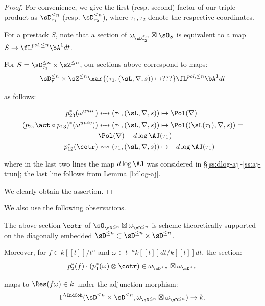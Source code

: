 \begin{proof}

For convenience, we give the first (resp. second) factor
of our triple product as
$\sD_{\tau_1}^{\leq n}$ (resp. $\sD_{\tau_2}^{\leq n}$),
where $\tau_1,\tau_2$ denote the respective coordinates.

For a prestack $S$, note that a section of
$\omega_{\sD_{\tau_2}^{\leq n}} \boxtimes \sO_S$ is equivalent to
a map $S \to \fL^{pol,\leq n} \bA^1 dt$.

For $S = \sD_{\tau_1}^{\leq n} \times \sZ^{\leq n}$,
our sections above correspond to maps:
%
\[
\sD_{\tau_1}^{\leq n} \times \sZ^{\leq n}
\xar{(\tau_1,(\sL,\nabla,s)) \mapsto ???}
\fL^{pol,\leq n} \bA^1 dt
\]

 as follows:

\begin{align*}
p_{23}^*(\omega^{univ}) & \leftrightsquigarrow
(\tau_1,(\sL,\nabla,s)) \mapsto
\Pol(\nabla) \\
(p_2,\act \circ p_{13})^*(\omega^{univ}))
& \leftrightsquigarrow
(\tau_1,(\sL,\nabla,s)) \mapsto
\Pol((\sL(\tau_1),\nabla,s)) = \\
&  \Pol(\nabla)+d\log\AJ(\tau_1) \\
p_{12}^*(\cotr) & \leftrightsquigarrow
(\tau_1,(\sL,\nabla,s)) \mapsto
-d\log\AJ(\tau_1)
\end{align*}

 where in the last two lines the map
$d\log\AJ$ was considered in
\S \ref{ss:dlog-aj}-\ref{ss:aj-trun}; the last line
follows from Lemma \ref{l:dlog-aj}.

We clearly obtain the assertion.

\end{proof}

We also use the following observations.

\begin{lem}
\notready\label{l:cotr-2}

The above section $\cotr$ of
$\sO_{\sD^{\leq n}} \boxtimes \omega_{\sD^{\leq n}}$
is scheme-theoretically supported on the diagonally embedded
$\sD^{\leq n} \subset \sD^{\leq n} \times \sD^{\leq n}$.

Moreover, for $f \in k[[t]]/t^n$ and
$\omega \in t^{-n}k[[t]]dt/k[[t]]dt$, the section:
%
\[
p_2^*(f) \cdot (p_1^*(\omega) \otimes \cotr) \in
\omega_{\sD^{\leq n}} \boxtimes \omega_{\sD^{\leq n}}
\]

 maps to $\Res(f\omega) \in k$ under the
adjunction morphism:
%
\[
\Gamma^{\IndCoh}(\sD^{\leq n} \times \sD^{\leq n},
\omega_{\sD^{\leq n}} \boxtimes \omega_{\sD^{\leq n}} ) \to k.
\]

\end{lem}

